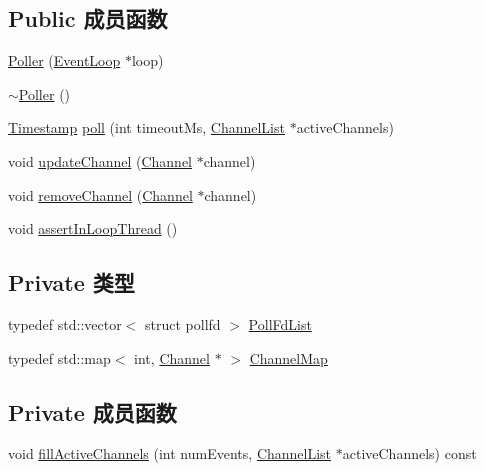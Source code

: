 \subsection*{Public 成员函数}
\begin{DoxyCompactItemize}
\item 
\hyperlink{classmuduo_1_1Poller_ad1445448c7a54f569eb9d6c6163ca7bc}{Poller} (\hyperlink{classmuduo_1_1EventLoop}{Event\+Loop} $\ast$loop)
\item 
\hyperlink{classmuduo_1_1Poller_a057f5fb0e9594deb1fd4b46f0e930557}{$\sim$\+Poller} ()
\item 
\hyperlink{classmuduo_1_1Timestamp}{Timestamp} \hyperlink{classmuduo_1_1Poller_a0165aabf2721e39f87ad67b05ece9267}{poll} (int timeout\+Ms, \hyperlink{classmuduo_1_1Poller_a0b74248ffee6df294563618187b52404}{Channel\+List} $\ast$active\+Channels)
\item 
void \hyperlink{classmuduo_1_1Poller_acaa4a191936aacf608d279a6f343d533}{update\+Channel} (\hyperlink{classmuduo_1_1Channel}{Channel} $\ast$channel)
\item 
void \hyperlink{classmuduo_1_1Poller_ab10f76c92cb5269f8296e5b3e4dd0ef9}{remove\+Channel} (\hyperlink{classmuduo_1_1Channel}{Channel} $\ast$channel)
\item 
void \hyperlink{classmuduo_1_1Poller_a9e9c23193ece3ba25a1a2779fc7ebc2d}{assert\+In\+Loop\+Thread} ()
\end{DoxyCompactItemize}
\subsection*{Private 类型}
\begin{DoxyCompactItemize}
\item 
typedef std\+::vector$<$ struct pollfd $>$ \hyperlink{classmuduo_1_1Poller_a0cf1be2f572740022edada139cacfb12}{Poll\+Fd\+List}
\item 
typedef std\+::map$<$ int, \hyperlink{classmuduo_1_1Channel}{Channel} $\ast$ $>$ \hyperlink{classmuduo_1_1Poller_a950db725d18ce33d8457ae784380a07e}{Channel\+Map}
\end{DoxyCompactItemize}
\subsection*{Private 成员函数}
\begin{DoxyCompactItemize}
\item 
void \hyperlink{classmuduo_1_1Poller_a93b3d6d6cac94e92c2ddfd91e9b18cc0}{fill\+Active\+Channels} (int num\+Events, \hyperlink{classmuduo_1_1Poller_a0b74248ffee6df294563618187b52404}{Channel\+List} $\ast$active\+Channels) const
\end{DoxyCompactItemize}
